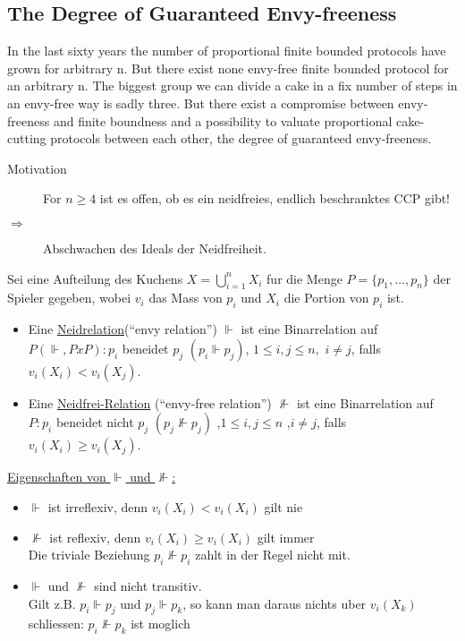 \subsection{The Degree of Guaranteed Envy-freeness}
In the last sixty years the number of proportional finite bounded protocols have grown for arbitrary n. But there exist none envy-free finite bounded protocol for an arbitrary n. The biggest group we can divide a cake in a fix number of steps in an envy-free way is sadly three. But there exist a compromise between envy-freeness and finite boundness and a possibility to valuate proportional cake-cutting protocols between each other, the degree of guaranteed envy-freeness. 
\begin{description}
 \item[Motivation] For $n\geq4$ ist es offen, ob es ein neidfreies, endlich beschranktes CCP gibt!
 \item[$\Rightarrow$] Abschwachen des Ideals der Neidfreiheit. 
\end{description}
\begin{defi}
 Sei eine Aufteilung des Kuchens $X=\bigcup\limits_{i=1}^n X_i$ fur die Menge $P=\{p_1,\dots,p_n\}$ der Spieler gegeben, wobei $v_i$
 das Mass von $p_i$ und $X_i$ die Portion von $p_i$ ist.
 \begin{itemize}
  \item Eine \underline{Neidrelation}(``envy relation'') $\Vdash$ ist eine Binarrelation auf $P(\Vdash, PxP):p_i$ beneidet 
        $p_j$ $(p_i\Vdash p_j)$, $1\leq i,j\leq n,$ $i\neq j$, falls $v_i(X_i)<v_i(X_j)$.
  \item Eine \underline{Neidfrei-Relation} (``envy-free relation'') $\nVdash$ ist eine Binarrelation auf $P:p_i$ beneidet nicht $p_j$ $(p_j
        \nVdash p_j)$ ,$1\leq i,j\leq n$ ,$i\neq j$, falls $v_i(X_i)\geq v_i(X_j)$.
 \end{itemize}
\end{defi}
\underline{Eigenschaften von $\Vdash$ und $\nVdash$:}
\begin{itemize}
 \item $\Vdash$ ist irreflexiv, denn $v_i(X_i)<v_i(X_i)$ gilt nie
 \item $\nVdash$ ist reflexiv, denn $v_i(X_i)\geq v_i(X_i)$ gilt immer\\Die triviale Beziehung $p_i \nVdash p_i$ zahlt in der Regel nicht
       mit.
 \item $\Vdash$ und $\nVdash$ sind nicht transitiv.\\
       Gilt z.B. $p_i\Vdash p_j$ und $p_j\Vdash p_k$, so kann man daraus nichts uber $v_i(X_k)$ schliessen: $p_i\nVdash p_k$ ist moglich
\end{itemize}
